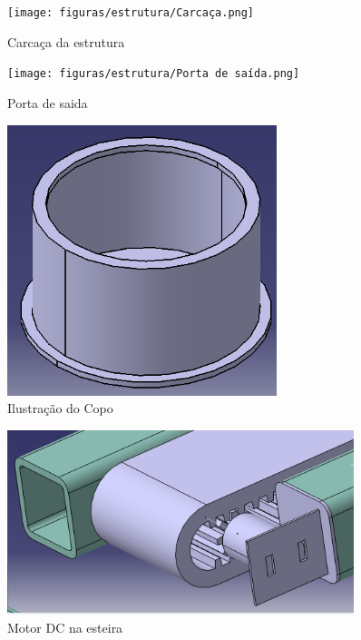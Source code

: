 \begin{apendicesenv}
\begin{figure}[H]
    \centering
    \texttt{[image: figuras/estrutura/Carcaça.png]}
    \caption{Carcaça da estrutura}
    \label{fig:Carcaca}
\end{figure}

\begin{figure}[H]
    \centering
    \texttt{[image: figuras/estrutura/Porta de saída.png]}
    \caption{Porta de saida}
    \label{fig:portas}
\end{figure}

\begin{figure}[H]
    \centering
    \includegraphics[width=0.7\textwidth]{figuras/estrutura/Copo.png}
    \caption{Ilustração do Copo}
    \label{fig:copos}
\end{figure}

\begin{figure}[H]
    \centering
    \includegraphics[width=0.9\textwidth]{figuras/estrutura/Motor DC na Esteira.png}
    \caption{Motor DC na esteira}
    \label{fig:DCnaesteira}
\end{figure}


\end{apendicesenv}
